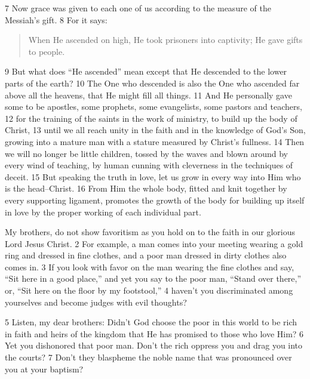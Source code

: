 \begin{bible}
7 Now grace was given to each one of us according to the measure of the Messiah's gift. 8 For it says:
\begin{quote}
When He ascended on high,
He took prisoners into captivity;
He gave gifts to people.
\end{quote}
9 But what does ``He ascended'' mean except that He descended to the lower parts of the earth? 10 The One who descended is also the One who ascended far above all the heavens, that He might fill all things. 11 And He personally gave some to be apostles, some prophets, some evangelists, some pastors and teachers, 12 for the training of the saints in the work of ministry, to build up the body of Christ, 13 until we all reach unity in the faith and in the knowledge of God's Son, growing into a mature man with a stature measured by Christ's fullness. 14 Then we will no longer be little children, tossed by the waves and blown around by every wind of teaching, by human cunning with cleverness in the techniques of deceit. 15 But speaking the truth in love, let us grow in every way into Him who is the head--Christ. 16 From Him the whole body, fitted and knit together by every supporting ligament, promotes the growth of the body for building up itself in love by the proper working of each individual part.

My brothers, do not show favoritism as you hold on to the faith in our glorious Lord Jesus Christ. 2 For example, a man comes into your meeting wearing a gold ring and dressed in fine clothes, and a poor man dressed in dirty clothes also comes in. 3 If you look with favor on the man wearing the fine clothes and say, ``Sit here in a good place,'' and yet you say to the poor man, ``Stand over there,'' or, ``Sit here on the floor by my footstool,'' 4 haven't you discriminated among yourselves and become judges with evil thoughts?

5 Listen, my dear brothers: Didn't God choose the poor in this world to be rich in faith and heirs of the kingdom that He has promised to those who love Him? 6 Yet you dishonored that poor man. Don't the rich oppress you and drag you into the courts? 7 Don't they blaspheme the noble name that was pronounced over you at your baptism?

\end{bible}

